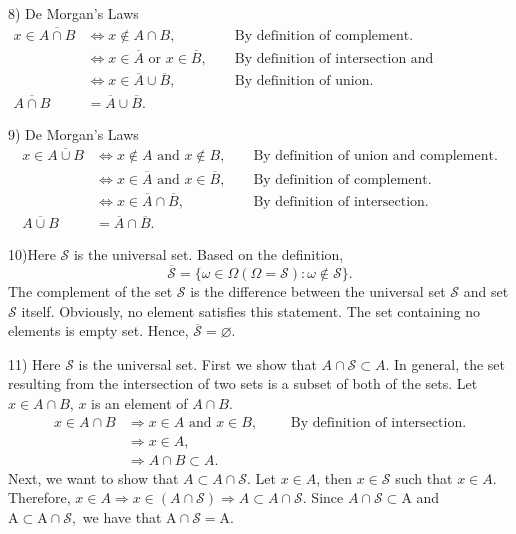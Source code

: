 \documentclass[12pt,thmsa]{article}
\begin{document}
8) De Morgan's Laws
\[
\begin{aligned}
    x \in \overline{A \cap B} &\Leftrightarrow x \notin A \cap B, & & \text{ By definition of complement.}\\
    &\Leftrightarrow x \in \overline{A} \text { or } x \in \overline{B}, & & \text{ By definition of intersection and complement.}\\
    &\Leftrightarrow  x \in \overline{A} \cup \overline{B},  & & \text{ By definition of union.}\\ 
    \overline{A \cap B} & = \overline{A} \cup \overline{B} .
\end{aligned}
\]

\medskip

9) De Morgan's Laws
\[
\begin{aligned}
    x \in \overline{A \cup B} &\Leftrightarrow x \notin A \text{ and } x \notin B, & & \text{ By definition of union and complement.}\\
    &\Leftrightarrow x \in \overline{A} \text { and } x \in \overline{B}, & & \text{ By definition of complement.}\\
    &\Leftrightarrow  x \in \overline{A} \cap \overline{B}, & & \text{ By definition of intersection.} \\ 
    \overline{A \cup B} & = \overline{A} \cap \overline{B}.
\end{aligned}
\]

\medskip

10)Here \(\mathcal{S}\) is the universal set. Based on the definition,
\[
\overline{\mathcal{S}} =\{ \omega \in \Omega ( \Omega= \mathcal{S}): \omega \notin  \mathcal{S} \}.
\]
The complement of the set \(\mathcal{S}\) is the difference between the universal set \(\mathcal{S}\) and set \(\mathcal{S}\) itself. Obviously, no element satisfies this statement. The set containing no elements is empty set. Hence, \(\overline{\mathcal{S}} = \varnothing\).

\medskip

11)
Here \(\mathcal{S}\) is the universal set.
First we show that \(A \cap  \mathcal{S} \subset A\). In general, the set resulting from the intersection of two sets is a subset of both of the sets. Let \(x \in A \cap  B\), \(x\) is an element of \(A \cap  B\).
\[\begin{aligned} 
 x \in A \cap  B & \Rightarrow x \in A \text{ and } x \in B, \qquad \text{ By definition of intersection.}\\
 & \Rightarrow x \in A, \\
 & \Rightarrow  A \cap B \subset A.
\end{aligned}\]
Next, we want to show that \( A \subset A \cap  \mathcal{S} \).
Let \(x \in A\), then \(x \in  \mathcal{S}\) such that \(x \in A \). Therefore, \(x \in A \Rightarrow x \in(A \cap \mathcal{S}) \Rightarrow A \subset A \cap  \mathcal{S} \).
Since \(A \cap \mathcal{S} \subset \mathrm{A}\) and \(\mathrm{A} \subset \mathrm{A} \cap \mathcal{S},\) we have that \(\mathrm{A} \cap \mathcal{S}=\mathrm{A}\).
\end{document}
